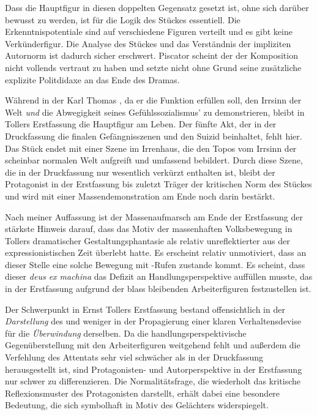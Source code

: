 Dass die Hauptfigur in diesen doppelten Gegensatz gesetzt ist, ohne sich
darüber bewusst zu werden, ist für die Logik des Stückes essentiell. 
Die Erkenntnispotentiale sind auf verschiedene Figuren verteilt und es gibt
keine  Verkünderfigur.
Die Analyse des Stückes und das Verständnis der impliziten Autornorm ist
dadurch sicher erschwert. Piscator scheint der  der
Komposition nicht vollends vertraut zu haben und setzte nicht ohne Grund seine
zusätzliche explizite Politdidaxe an das Ende des Dramas. 

 
Während in der  Karl Thomas \Cite{logischerweise
  zerbricht}, 
da er die Funktion erfüllen soll, den Irrsinn der Welt \emph{und}
die Abwegigkeit seines Gefühlssozialismus' zu demonstrieren, bleibt in
Tollers Erstfassung die Hauptfigur am Leben. Der fünfte Akt, der in der
Druckfassung die finalen Gefängnisszenen und den Suizid beinhaltet, fehlt hier. 
Das Stück endet mit einer Szene im Irrenhaus, die den Topos vom Irrsinn der
scheinbar normalen Welt aufgreift und umfassend bebildert. Durch diese Szene,
die in der Druckfassung nur wesentlich verkürzt enthalten ist, bleibt der
Protagonist in der Erstfassung bis zuletzt Träger der kritischen Norm des
Stückes und wird mit einer Massendemonstration am Ende noch darin bestärkt. 

Nach meiner Auffassung ist der Massenaufmarsch am Ende der Erstfassung der
stärkste Hinweis darauf, dass das Motiv der massenhaften Volksbewegung in
Tollers dramatischer Gestaltungsphantasie als relativ unreflektierter
 aus der expressionistischen Zeit überlebt hatte. Es
erscheint relativ unmotiviert, dass an dieser
Stelle eine solche Bewegung mit \Cite{Hoch Karl Thomas!}-Rufen
 zustande kommt. Es scheint, dass dieser \emph{deus ex
  machina} das Defizit an Handlungsperspektive auffüllen musste, das in der
Erstfassung aufgrund der blass bleibenden Arbeiterfiguren festzustellen ist.

Der Schwerpunkt in Ernst Tollers Erstfassung bestand offensichtlich in
der \emph{Darstellung} des \Cite{Irrsinns der Welt} und weniger in der Propagierung
einer klaren Verhaltensdevise für die \emph{Überwindung} derselben. Da die
handlungsperspektivische Gegenüberstellung mit den Arbeiterfiguren weitgehend
fehlt und außerdem die Verfehlung des Attentats sehr viel schwächer als in der
Druckfassung herausgestellt ist, sind Protagonisten- und Autorperspektive
in der Erstfassung nur schwer zu differenzieren. Die Normalitätsfrage, die
wiederholt das kritische Reflexionsmuster des Protagonisten darstellt, erhält
dabei eine besondere Bedeutung, die sich symbolhaft in Motiv des Gelächters
widerspiegelt.  

